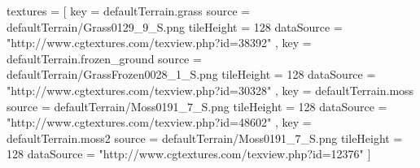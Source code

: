 textures = [
    {
        key         = defaultTerrain.grass
        source      = defaultTerrain/Grass0129_9_S.png
        tileHeight  = 128
        dataSource  = "http://www.cgtextures.com/texview.php?id=38392"
    }, {
        key         = defaultTerrain.frozen_ground
        source      = defaultTerrain/GrassFrozen0028_1_S.png
        tileHeight  = 128
        dataSource  = "http://www.cgtextures.com/texview.php?id=30328"
    }, {
        key         = defaultTerrain.moss
        source      = defaultTerrain/Moss0191_7_S.png
        tileHeight  = 128
        dataSource  = "http://www.cgtextures.com/texview.php?id=48602"
    }, {
        key         = defaultTerrain.moss2
        source      = defaultTerrain/Moss0191_7_S.png
        tileHeight  = 128
        dataSource = "http://www.cgtextures.com/texview.php?id=12376"
    }
]
